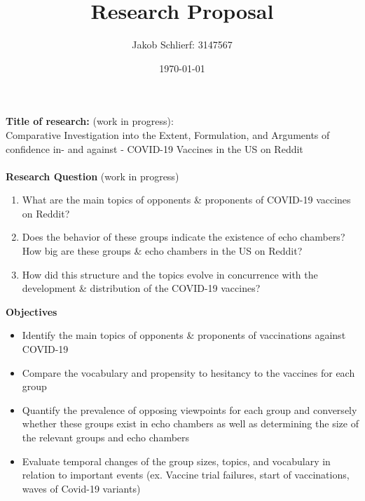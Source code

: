 \documentclass{article}
\title{Research Proposal}
\author{Jakob Schlierf: 3147567}
\date{\today}
\begin{document}
    \maketitle{}
    {\raggedleft\textbf{Title of research:} (work in progress):} \\
    Comparative Investigation into the Extent, Formulation, and Arguments of confidence in- and against - COVID-19 Vaccines in the US on Reddit \\ \\

    {\raggedleft\textbf{Research Question} (work in progress)}
    \begin{enumerate}
        \item What are the main topics of opponents \& proponents of COVID-19 vaccines on Reddit?
        \item Does the behavior of these groups indicate the existence of echo chambers? How big are these groups \& echo chambers in the US on Reddit?
        \item How did this structure and the topics evolve in concurrence with the development \& distribution of the COVID-19 vaccines? 
    \end{enumerate}

    {\raggedleft\textbf{Objectives}}
    \begin{itemize}
        \item Identify the main topics of opponents \& proponents of vaccinations against COVID-19
        \item Compare the vocabulary and propensity to hesitancy to the vaccines for each group
        \item Quantify the prevalence of opposing viewpoints for each group and conversely whether these groups exist in echo chambers as well as determining the size of the relevant groups and echo chambers
        \item Evaluate temporal changes of the group sizes, topics, and vocabulary in relation to important events (ex. Vaccine trial failures, start of vaccinations, waves of Covid-19 variants)  
    \end{itemize}
\end{document}
